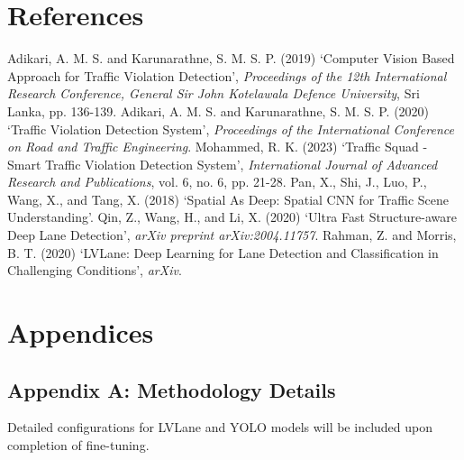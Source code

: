\documentclass[12pt,a4paper]{article}
\begin{document}
\section*{References}
\begin{thebibliography}{9}
 Adikari, A. M. S. and Karunarathne, S. M. S. P. (2019) `Computer Vision Based Approach for Traffic Violation Detection', \textit{Proceedings of the 12th International Research Conference, General Sir John Kotelawala Defence University}, Sri Lanka, pp. 136-139.
 Adikari, A. M. S. and Karunarathne, S. M. S. P. (2020) `Traffic Violation Detection System', \textit{Proceedings of the International Conference on Road and Traffic Engineering}.
 Mohammed, R. K. (2023) `Traffic Squad - Smart Traffic Violation Detection System', \textit{International Journal of Advanced Research and Publications}, vol. 6, no. 6, pp. 21-28.
 Pan, X., Shi, J., Luo, P., Wang, X., and Tang, X. (2018) `Spatial As Deep: Spatial CNN for Traffic Scene Understanding'.
 Qin, Z., Wang, H., and Li, X. (2020) `Ultra Fast Structure-aware Deep Lane Detection', \textit{arXiv preprint arXiv:2004.11757}.
 Rahman, Z. and Morris, B. T. (2020) `LVLane: Deep Learning for Lane Detection and Classification in Challenging Conditions', \textit{arXiv}.
\end{thebibliography}

\newpage
\section*{Appendices}
\subsection*{Appendix A: Methodology Details}
Detailed configurations for LVLane and YOLO models will be included upon completion of fine-tuning.
\end{document}

